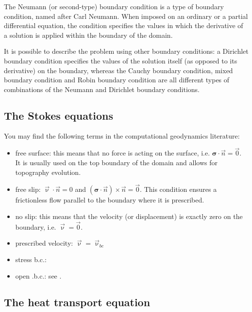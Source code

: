 The Neumann (or second-type) boundary condition is a type of boundary condition, 
named after Carl Neumann. When imposed on an ordinary or a partial differential equation, 
the condition specifies the values in which the derivative of a solution is 
applied within the boundary of the domain.

It is possible to describe the problem using other boundary conditions: 
a Dirichlet boundary condition specifies the values of the solution itself 
(as opposed to its derivative) on the boundary, whereas the Cauchy boundary condition, 
mixed boundary condition and Robin boundary condition are all different types of combinations 
of the Neumann and Dirichlet boundary conditions.


\subsection{The Stokes equations}

You may find the following terms in the computational geodynamics literature:

\begin{itemize}
\item { free surface}: this means that no force is acting on the surface, i.e. ${\bm \sigma}\cdot {\vec n}={\vec 0}$. It is usually used on the top boundary of the domain and allows for topography evolution.
\item { free slip}: ${\vec \upnu}\cdot \vec n = 0$ and $({\bm \sigma}\cdot{\vec n})\times {\vec n}={\vec 0}$. This condition ensures a frictionless flow parallel to the boundary where it is prescribed.
\item { no slip}: this means that the velocity (or displacement) is exactly zero on the boundary, i.e. ${\vec \upnu}={\vec 0}$.
\item { prescribed velocity}: ${\vec \upnu}={\vec \upnu}_{bc}$
\item stress b.c.: 
\item open .b.c.: see . 
\end{itemize}

\subsection{The heat transport equation}

